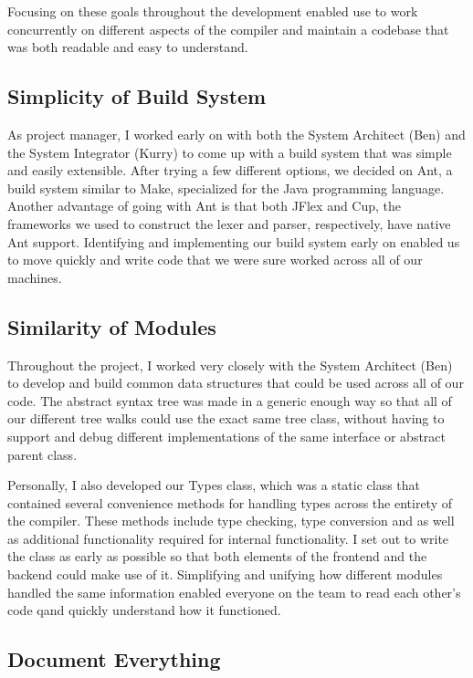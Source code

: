 \documentclass{report}
\begin{document}
Focusing on these goals throughout the development enabled use to work concurrently
on different aspects of the compiler and maintain a codebase that was both readable
and easy to understand.  

\subsection{Simplicity of Build System}

As project manager, I worked early on with both the System Architect (Ben) and
the System Integrator (Kurry) to come up with a build system that was simple and
easily extensible. After trying a few different options, we decided on Ant,
a build system similar to Make, specialized for the Java programming language.
Another advantage of going with Ant is that both JFlex and Cup, the frameworks
we used to construct the lexer and parser, respectively, have native Ant support.
Identifying and implementing our build system early on enabled us to move quickly
and write code that we were sure worked across all of our machines. 

\subsection{Similarity of Modules}

Throughout the project, I worked very closely with the System Architect (Ben) to
develop and build common data structures that could be used across all of our
code. The abstract syntax tree was made in a generic enough way so that all
of our different tree walks could use the exact same tree class, without having
to support and debug different implementations of the same interface or abstract
parent class.  

Personally, I also developed our Types class, which was a static class that
contained several convenience methods for handling types across the entirety
of the compiler. These methods include type checking, type conversion and
as well as additional functionality required for internal functionality. I
set out to write the class as early as possible so that both elements of
the frontend and the backend could make use of it. Simplifying and unifying how
different modules handled the same information enabled everyone on the team to
read each other's code qand quickly understand how it functioned.

\subsection{Document Everything}
\end{document}
